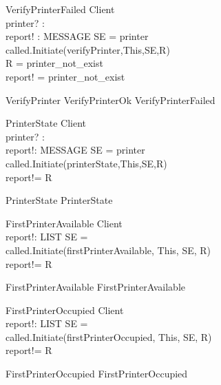 \begin{schema}{VerifyPrinterFailed}
\Xi Client \\
printer? : \nat \\
report! : MESSAGE
\where
SE = \lseq printer \rseq \\
called.Initiate(verifyPrinter,This,SE,R) \\
R = printer\_not\_exist \\
report! = printer\_not\_exist
\end{schema}


\begin{zed}
VerifyPrinter \sdef VerifyPrinterOk \lor VerifyPrinterFailed \end{zed}

\begin{schema}{PrinterState}
\Delta Client \\
printer? : \nat \\
report!: MESSAGE
\where
SE = \lseq printer \rseq \\
called.Initiate(printerState,This,SE,R) \\
report!= R
\end{schema}

\begin{zed}
PrinterState \sdef PrinterState \end{zed}



\begin{schema}{FirstPrinterAvailable}
\Delta Client \\
report!: LIST
\where
SE = \lseq  \rseq \\
called.Initiate(firstPrinterAvailable, This, SE, R) \\
report!= R
\end{schema}

\begin{zed}
FirstPrinterAvailable \sdef FirstPrinterAvailable \end{zed}

\begin{schema}{FirstPrinterOccupied}
\Delta Client \\
report!: LIST
\where
SE = \lseq  \rseq \\
called.Initiate(firstPrinterOccupied, This, SE, R) \\
report!= R
\end{schema}

\begin{zed}
FirstPrinterOccupied \sdef FirstPrinterOccupied \end{zed}

